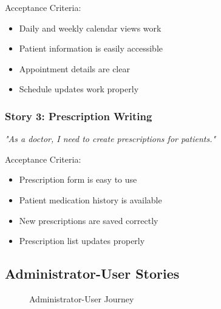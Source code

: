 \documentclass[12pt,a4paper]{article}
\begin{document}
Acceptance Criteria:
\begin{itemize}[itemsep=0.1cm]
    \item Daily and weekly calendar views work
    \item Patient information is easily accessible
    \item Appointment details are clear
    \item Schedule updates work properly
\end{itemize}

\subsubsection{Story 3: Prescription Writing}

\begin{center}
    \textit{"As a doctor, I need to create prescriptions for patients."}

\end{center}

Acceptance Criteria:
\begin{itemize}[itemsep=0.1cm]
    \item Prescription form is easy to use
    \item Patient medication history is available
    \item New prescriptions are saved correctly
    \item Prescription list updates properly
\end{itemize}

\subsection{Administrator-User Stories}

\begin{figure}[h!]
\centering
{}
\caption{Administrator-User Journey}
\label{fig:admin_journey}
\end{figure}
\end{document}
